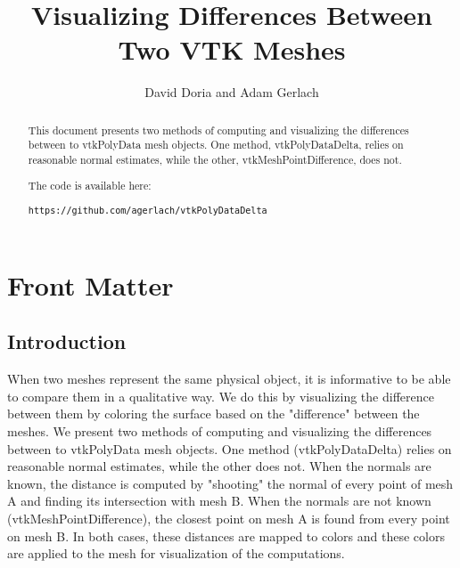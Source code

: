 \documentclass{ComputationalAlgorithmsArticle}
\title{Visualizing Differences Between Two VTK Meshes}
\author{David Doria and Adam Gerlach}
\newcommand{\IJhandlerIDnumber}{3303}
\begin{document}
\IJhandlefooter{\IJhandlerIDnumber}


\ifpdf
\else
\fi


\maketitle


\ifhtml
\chapter*{Front Matter\label{front}}
\fi

\begin{abstract}
\noindent

This document presents two methods of computing and visualizing the differences between to vtkPolyData mesh objects. One method, vtkPolyDataDelta, relies on reasonable normal estimates, while the other, vtkMeshPointDifference, does not.

The code is available here:
\begin{verbatim}
https://github.com/agerlach/vtkPolyDataDelta
\end{verbatim}


\end{abstract}

\IJhandlenote{\IJhandlerIDnumber}

\tableofcontents
\section{Introduction}
When two meshes represent the same physical object, it is informative to be able to compare them in a qualitative way.
We do this by visualizing the difference between them by coloring the surface based on the "difference" between
the meshes. We present two methods of computing and visualizing the differences between to vtkPolyData mesh objects. One method (vtkPolyDataDelta) relies on reasonable normal estimates, while the other does not. When the normals are known, the distance is computed by "shooting" the normal of every point of mesh A and finding its intersection with mesh B. When the normals are not known (vtkMeshPointDifference), the closest point on mesh A is found from every point on mesh B. In both cases, these distances are mapped to colors and these colors are applied to the mesh for visualization of the computations.
\end{document}
